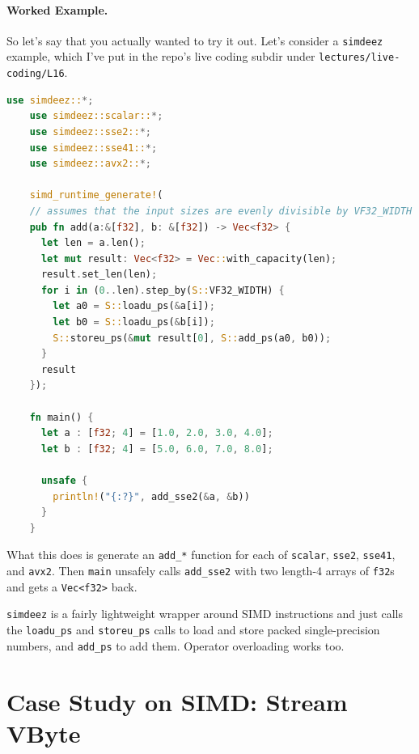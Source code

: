 
\paragraph{Worked Example.} So let's say that you actually wanted to try it out. Let's consider a \texttt{simdeez} example, which I've put in the repo's live coding subdir under \texttt{lectures/live-coding/L16}.

\begin{lstlisting}[language=Rust]
    use simdeez::*;
    use simdeez::scalar::*;
    use simdeez::sse2::*;
    use simdeez::sse41::*;
    use simdeez::avx2::*;

    simd_runtime_generate!(
    // assumes that the input sizes are evenly divisible by VF32_WIDTH
    pub fn add(a:&[f32], b: &[f32]) -> Vec<f32> {
      let len = a.len();
      let mut result: Vec<f32> = Vec::with_capacity(len);
      result.set_len(len);
      for i in (0..len).step_by(S::VF32_WIDTH) {
        let a0 = S::loadu_ps(&a[i]);
        let b0 = S::loadu_ps(&b[i]);
        S::storeu_ps(&mut result[0], S::add_ps(a0, b0));
      }
      result
    });

    fn main() {
      let a : [f32; 4] = [1.0, 2.0, 3.0, 4.0];
      let b : [f32; 4] = [5.0, 6.0, 7.0, 8.0];

      unsafe {
        println!("{:?}", add_sse2(&a, &b))
      }
    }
\end{lstlisting}
What this does is generate an \texttt{add\_*} function for each of \texttt{scalar},
\texttt{sse2}, \texttt{sse41}, and \texttt{avx2}. Then \texttt{main}
unsafely calls \texttt{add\_sse2} with two length-4 arrays of \texttt{f32}s and
gets a \texttt{Vec<f32>} back.

\texttt{simdeez} is a fairly lightweight wrapper around SIMD instructions and just
calls the \texttt{loadu\_ps} and \texttt{storeu\_ps} calls to load and store
packed single-precision numbers, and \texttt{add\_ps} to add them. Operator overloading
works too.

\newpage
\section*{Case Study on SIMD: Stream VByte }

